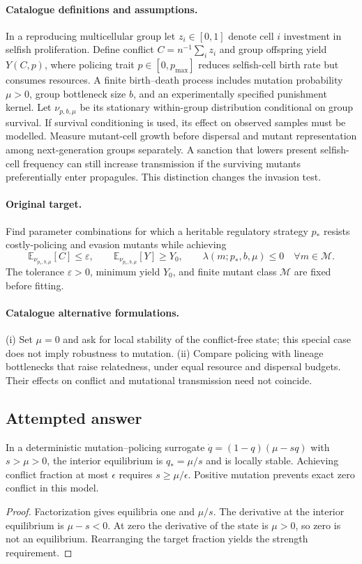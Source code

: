 \documentclass[11pt]{article}
\begin{document}
\paragraph{Catalogue definitions and assumptions.}
In a reproducing multicellular group let $z_i\in[0,1]$ denote cell $i$ investment in selfish proliferation. Define conflict $C=n^{-1}\sum_i z_i$ and group offspring yield $Y(C,p)$, where policing trait $p\in[0,p_{\max}]$ reduces selfish-cell birth rate but consumes resources. A finite birth--death process includes mutation probability $\mu>0$, group bottleneck size $b$, and an experimentally specified punishment kernel. Let $\nu_{p,b,\mu}$ be its stationary within-group distribution conditional on group survival. If survival conditioning is used, its effect on observed samples must be modelled. Measure mutant-cell growth before dispersal and mutant representation among next-generation groups separately. A sanction that lowers present selfish-cell frequency can still increase transmission if the surviving mutants preferentially enter propagules. This distinction changes the invasion test.
\paragraph{Original target.}
Find parameter combinations for which a heritable regulatory strategy $p_*$ resists costly-policing and evasion mutants while achieving
\[
 \mathbb{E}_{\nu_{p_*,b,\mu}}[C]\le\varepsilon,
 \qquad \mathbb{E}_{\nu_{p_*,b,\mu}}[Y]\ge Y_0,
 \qquad \lambda(m;p_*,b,\mu)\le0\quad\forall m\in\mathcal M.
\]
The tolerance $\varepsilon>0$, minimum yield $Y_0$, and finite mutant class $\mathcal M$ are fixed before fitting.
\paragraph{Catalogue alternative formulations.}
(i) Set $\mu=0$ and ask for local stability of the conflict-free state; this special case does not imply robustness to mutation. (ii) Compare policing with lineage bottlenecks that raise relatedness, under equal resource and dispersal budgets. Their effects on conflict and mutational transmission need not coincide.
\subsection{Attempted answer}
\begin{proposition}
In a deterministic mutation--policing surrogate $\dot q=(1-q)(\mu-sq)$ with $s>\mu>0$, the interior equilibrium is $q_* =\mu/s$ and is locally stable. Achieving conflict fraction at most $\epsilon$ requires $s\geq\mu/\epsilon$. Positive mutation prevents exact zero conflict in this model.
\end{proposition}
\begin{proof}
Factorization gives equilibria one and $\mu/s$. The derivative at the interior equilibrium is $\mu-s<0$. At zero the derivative of the state is $\mu>0$, so zero is not an equilibrium. Rearranging the target fraction yields the strength requirement.
\end{proof}
\end{document}

